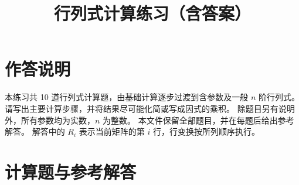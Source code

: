 \documentclass[UTF8,12pt,a4paper,fontset=fandol]{ctexart}
\title{行列式计算练习（含答案）}
\author{}
\date{}
\begin{document}
\maketitle

\section*{作答说明}
本练习共 10 道行列式计算题，由基础计算逐步过渡到含参数及一般 $n$ 阶行列式。
请写出主要计算步骤，并将结果尽可能化简或写成因式的乘积。
除题目另有说明外，所有参数均为实数，$n$ 为整数。
本文件保留全部题目，并在每题后给出参考解答。
解答中的 $R_i$ 表示当前矩阵的第 $i$ 行，行变换按所列顺序执行。

\section*{计算题与参考解答}
\end{document}
